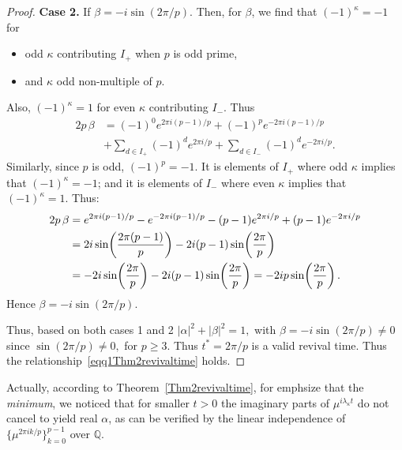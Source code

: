 \documentclass[12pt]{amsart}
\begin{document}
\begin{proof}
  \medskip

\textbf{Case 2.} If $\beta= -i\sin(2\pi/p)$. Then, 
 for $\beta$, we find that $(-1)^{\kappa}=-1$ for
  \begin{itemize}
      \item  odd $\kappa$ contributing $I_+$ when $p$ is odd prime,
      \item and $\kappa$ odd non-multiple of $p$.
  \end{itemize}
Also, $(-1)^{\kappa}=1$ for even $\kappa$ contributing $I_-$. Thus
  \begin{align*}
    2p\,\beta &= (-1)^0 e^{2\pi i(p-1)/p} + (-1)^p e^{-2\pi i(p-1)/p}\\
&+ \sum_{d\in I_+}(-1)^d e^{2\pi i/p}  + \sum_{d\in I_-}(-1)^d e^{-2\pi i/p}.
  \end{align*}
Similarly, since $p$ is odd, $(-1)^p = -1$. It is elements of $I_+$ where odd $\kappa$ implies that $(-1)^{\kappa}=-1$; and it is elements
  of $I_-$ where even $\kappa$ implies that $(-1)^{\kappa}=1$. Thus:
  \begin{align*}
    2p\,\beta &= e^{2\pi i(p-1)/p} - e^{-2\pi i(p-1)/p}
                 - (p-1)e^{2\pi i/p} + (p-1)e^{-2\pi i/p}\notag\\
               &= 2i\sin\!\left(\frac{2\pi(p-1)}{p}\right) - 2i(p-1)\sin\!\left(\frac{2\pi}{p}\right)\notag\\
               &= -2i\sin\!\left(\frac{2\pi}{p}\right) - 2i(p-1)\sin\!\left(\frac{2\pi}{p}\right)
                = -2ip\sin\!\left(\frac{2\pi}{p}\right).\label{eq:beta_calc}
  \end{align*}
  Hence $\beta= -i\sin(2\pi/p)$.

Thus, based on both cases 1 and 2 $  |\alpha|^2 + |\beta|^2=1,$
  with $\beta = -i\sin(2\pi/p) \neq 0$ since $\sin(2\pi/p) \neq 0,$ for $p \geq 3$.  Thus $t^* = 2\pi/p$ is a valid revival time. Thus the relationship~\eqref{eqq1Thm2revivaltime} holds. 
\end{proof}

Actually, according to Theorem~\ref{Thm2revivaltime},  for emphsize that the \emph{minimum},  we noticed that  for smaller $t > 0$ the imaginary parts of
  $\mu^{i\lambda_{\kappa} t}$ do not cancel to yield real $\alpha$, as can be verified by the
  linear independence of $\{\mu^{2\pi i k/p}\}_{k=0}^{p-1}$ over $\mathbb{Q}$.
  
\end{document}
